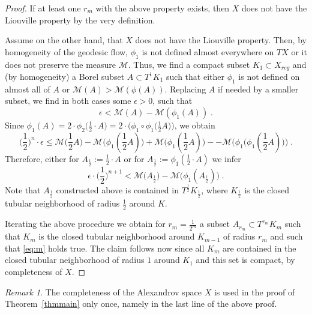 \documentclass[12pt,leqno,intlimits]{amsart}
\numberwithin{equation}{section}
\theoremstyle{definition}
\theoremstyle{remark}
\newtheorem{rem}[thm]{Remark}
\newcommand{\tref}[1]{Theorem~\ref{#1}}
\begin{document}
\begin{proof}
If at least one $r_m$ with the above property exists, then $X$  does not have the Liouville property by the very definition.

Assume on the other hand, that $X$ does not have the Liouville property. Then,  by homogeneity of the geodesic flow,  $\phi _1$ is not defined almost everywhere on $TX$ or it does not preserve the measure $\mathcal M$. Thus, we find a compact subset $K_1\subset X_{reg}$ and (by homogeneity) a Borel subset $A\subset T^1 K_1$ such that either $\phi_1$ is not defined on almost all of $A$ or $\mathcal M (A) > \mathcal M(\phi (A))$.  Replacing $A$
if needed by a smaller  subset, we find in both cases some $\epsilon >0$, such that   $$\epsilon < \mathcal M (A) - \mathcal M(\phi_1 (A)) \; .$$
Since $\phi_1 (A)=2\cdot \phi _2 \Big (\frac 1 2 \cdot A \Big)=2\cdot \Big(\phi _1 \circ \phi_1 \Big (\frac 1 2 A \Big ) \Big )$,
we obtain
$$\Big(\frac 1 2 \Big )^n \cdot \epsilon \leq  \mathcal M \big(\frac 1 2 A \big) - \mathcal M \big( \phi_1 (\frac 1 2 A ) \big) + \mathcal M \big(\phi_1 (\frac 1 2 A )\big)-
 - \mathcal M\big (\phi_1 \big (\phi _1 (\frac 1 2 A )\big) \big) \; .$$
Therefore,  either for $A_{\frac 1 2} := \frac 1 2  \cdot A$ or for $A_{\frac 1 2} := \phi_1 (\frac 1 2 \cdot A)$ we infer
$$\epsilon \cdot \Big(\frac 1 2 \Big )^{n+1}  < \mathcal M \big(A _{\frac 1 2} \big) - \mathcal M \big( \phi_1 (A _{\frac 1 2}) \big) \; .$$
Note that $A_{\frac 1 2}$ constructed above is contained in $T^{\frac 1 2} K_{\frac 1 2}$, where $K _{\frac 1 2}$ is the closed tubular neighborhood  of
radius $\frac 1 2$ around $K$.

Iterating the above procedure we obtain  for $r_m =\frac 1 {2^m}$   a subset $A_{r_m} \subset T^{r_m} K_m$  such that $K_m$ is the closed tubular neighborhood around $K_{m-1}$ of radius $r_m$ and such that \eqref{eq:m} holds true.  The claim follows now since all $K_m$ are contained in the closed tubular neighborhood of radius $1$ around $K_1$ and this set is compact, by completeness of $X$.
\end{proof}


\begin{rem}
The completeness of the Alexandrov space $X$ is used in the proof of \tref{thmmain} only once, namely in the last line of the above proof.
\end{rem}
\end{document}
